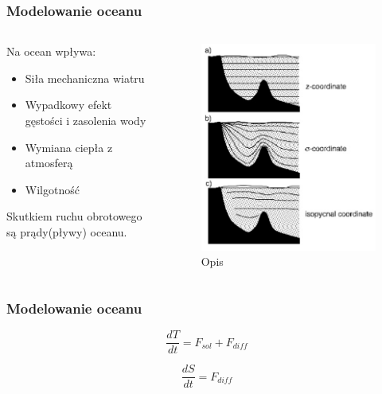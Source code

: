 \documentclass{beamer}
\begin{document}
\begin{frame}
	\frametitle{Modelowanie oceanu}
	\begin{columns}
		\begin{column}{0.5\textwidth}
			Na ocean wpływa:
			\begin{itemize}
				\item Siła mechaniczna wiatru
				\item Wypadkowy efekt gęstości i zasolenia wody
				\item Wymiana ciepła z atmosferą
				\item Wilgotność
			\end{itemize}
			Skutkiem ruchu obrotowego są prądy(pływy) oceanu.			
			
		\end{column}
		\begin{column}{0.5\textwidth}
			\begin{figure}[h]
				\begin{center}
					\includegraphics[width=0.8\linewidth]{images/Figure5.png}
					\caption{Opis}
				\end{center}
			\end{figure}
		\end{column}
		
	\end{columns}
	
	
\end{frame}
\begin{frame}
	\frametitle{Modelowanie oceanu}
\begin{block}{}
\[\frac{dT}{dt} = F_{sol} + F_{diff}	\]
\end{block}
\begin{block}{}
\[\frac{dS}{dt} = F_{diff}	\]
\end{block}


	
	
\end{frame}
\end{document}
